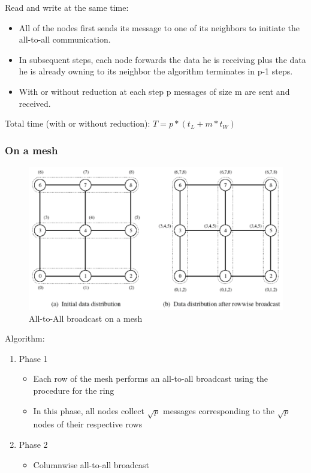 \documentclass[11pt,a4paper]{report}
\begin{document}
Read and write at the same time:

\begin{itemize}
    \item All of the nodes first sends its message to one of its neighbors to 
    initiate the all-to-all communication.
    
    \item In subsequent steps, each node forwards the data he is receiving plus 
    the data he is already owning to its neighbor the algorithm terminates in 
    p-1 steps.
    
    \item With or without reduction at each step p messages of size m are sent 
    and received.
\end{itemize}

Total time (with or without reduction): $T = p*(t_{L} + m*t_{W})$

\subsubsection{On a mesh}

\begin{figure}[H]
    \centering
    \includegraphics[width=0.7\linewidth]{img/comm_mesh_al-to-all}
    \caption{All-to-All broadcast on a mesh}
    \label{fig:commmeshal-to-all}
\end{figure}

Algorithm:

\begin{enumerate}
    \item Phase 1
    \begin{itemize}
        \item Each row of the mesh performs an all-to-all broadcast using the 
        procedure for the ring
        
        \item In this phase, all nodes collect $\sqrt{p}$ messages 
        corresponding to the $\sqrt{p}$ nodes of their respective rows
    \end{itemize}
    
    \item Phase 2
    \begin{itemize}
        \item Columnwise all-to-all broadcast
    \end{itemize}
\end{enumerate}
\end{document}
